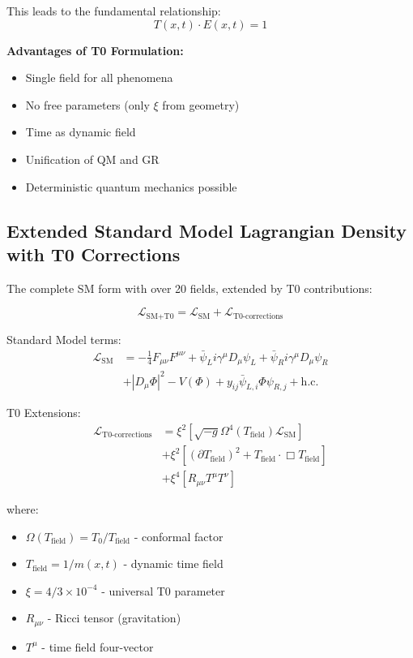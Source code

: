 \documentclass[12pt,a4paper]{article}
\begin{document}
	This leads to the fundamental relationship:
	\begin{equation}
		\boxed{T(x,t) \cdot E(x,t) = 1}
	\end{equation}
	
	\textbf{Advantages of T0 Formulation:}
	\begin{itemize}
		\item Single field for all phenomena
		\item No free parameters (only $\xi$ from geometry)
		\item Time as dynamic field
		\item Unification of QM and GR
		\item Deterministic quantum mechanics possible
	\end{itemize}
	
	\subsection{Extended Standard Model Lagrangian Density with T0 Corrections}
	
	The complete SM form with over 20 fields, extended by T0 contributions:
	
	\begin{smbox}
		\begin{equation}
			\mathcal{L}_{\text{SM+T0}} = \mathcal{L}_{\text{SM}} + \mathcal{L}_{\text{T0-corrections}}
		\end{equation}
		
		Standard Model terms:
		\begin{align}
			\mathcal{L}_{\text{SM}} &= -\frac{1}{4}F_{\mu\nu}F^{\mu\nu} + \bar{\psi}_L i\gamma^\mu D_\mu \psi_L + \bar{\psi}_R i\gamma^\mu D_\mu \psi_R \\
			&+ |D_\mu \Phi|^2 - V(\Phi) + y_{ij}\bar{\psi}_{L,i}\Phi\psi_{R,j} + \text{h.c.}
		\end{align}
		
		T0 Extensions:
		\begin{align}
			\mathcal{L}_{\text{T0-corrections}} &= \xi^2 \left[ \sqrt{-g} \Omega^4(T_{\text{field}}) \mathcal{L}_{\text{SM}} \right] \\
			&+ \xi^2 \left[ (\partial T_{\text{field}})^2 + T_{\text{field}} \cdot \Box T_{\text{field}} \right] \\
			&+ \xi^4 \left[ R_{\mu\nu} T^{\mu} T^{\nu} \right]
		\end{align}
		
		where:
		\begin{itemize}
			\item $\Omega(T_{\text{field}}) = T_0/T_{\text{field}}$ - conformal factor
			\item $T_{\text{field}} = 1/m(x,t)$ - dynamic time field
			\item $\xi = 4/3 \times 10^{-4}$ - universal T0 parameter
			\item $R_{\mu\nu}$ - Ricci tensor (gravitation)
			\item $T^{\mu}$ - time field four-vector
		\end{itemize}
	\end{smbox}
	
\end{document}
